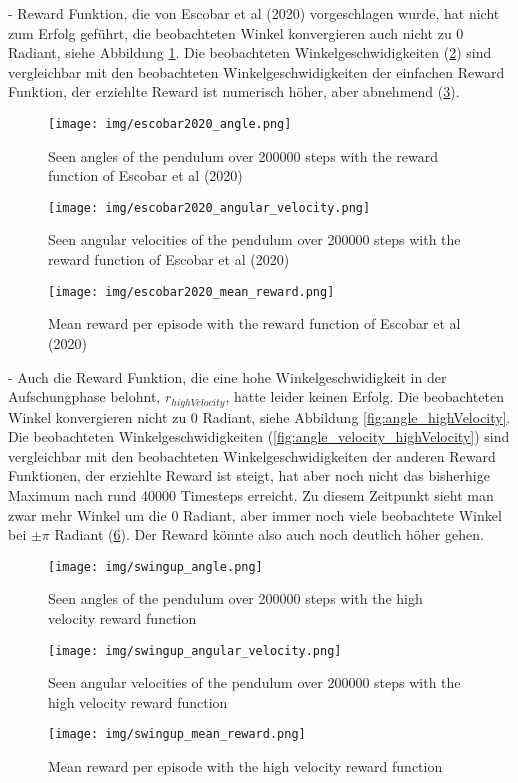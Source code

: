 - Reward Funktion, die von Escobar et al (2020) vorgeschlagen wurde, hat nicht zum Erfolg geführt, die beobachteten Winkel konvergieren auch nicht zu 0 Radiant, siehe Abbildung \ref{fig:angle_escobar2020}. Die beobachteten Winkelgeschwidigkeiten (\ref{fig:angle_velocity_escobar2020}) sind vergleichbar mit den beobachteten Winkelgeschwidigkeiten der einfachen Reward Funktion, der erziehlte Reward ist numerisch höher, aber abnehmend (\ref{fig:mean_reward_escobar2020}).
\begin{figure}[htbp]
    \centering
    \texttt{[image: img/escobar2020\_angle.png]}
    \caption{Seen angles of the pendulum over 200000 steps with the reward function of Escobar et al (2020)}
    \label{fig:angle_escobar2020}
\end{figure}
\begin{figure}[htbp]
    \centering
    \texttt{[image: img/escobar2020\_angular\_velocity.png]}
    \caption{Seen angular velocities of the pendulum over 200000 steps with the reward function of Escobar et al (2020)}
    \label{fig:angle_velocity_escobar2020}
\end{figure}
\begin{figure}[htbp]
    \centering
    \texttt{[image: img/escobar2020\_mean\_reward.png]}
    \caption{Mean reward per episode with the reward function of Escobar et al (2020)}
    \label{fig:mean_reward_escobar2020}
\end{figure}

- Auch die Reward Funktion, die eine hohe Winkelgeschwidigkeit in der Aufschungphase belohnt, $r_{highVelocity}$, hatte leider keinen Erfolg. Die beobachteten Winkel konvergieren nicht zu 0 Radiant, siehe Abbildung \ref{fig:angle_highVelocity}. Die beobachteten Winkelgeschwidigkeiten (\ref{fig:angle_velocity_highVelocity}) sind vergleichbar mit den beobachteten Winkelgeschwidigkeiten der anderen Reward Funktionen, der erziehlte Reward ist steigt, hat aber noch nicht das bisherhige Maximum nach rund 40000 Timesteps erreicht. Zu diesem Zeitpunkt sieht man zwar mehr Winkel um die 0 Radiant, aber immer noch viele beobachtete Winkel bei $\pm\pi$ Radiant (\ref{fig:mean_reward_swingup}). Der Reward könnte also auch noch deutlich höher gehen.
\begin{figure}[htbp]
    \centering
    \texttt{[image: img/swingup\_angle.png]}
    \caption{Seen angles of the pendulum over 200000 steps with the high velocity reward function}
    \label{fig:angle_swingup}
\end{figure}
\begin{figure}[htbp]
    \centering
    \texttt{[image: img/swingup\_angular\_velocity.png]}
    \caption{Seen angular velocities of the pendulum over 200000 steps with the high velocity reward function}
    \label{fig:angle_velocity_swingup}
\end{figure}
\begin{figure}[htbp]
    \centering
    \texttt{[image: img/swingup\_mean\_reward.png]}
    \caption{Mean reward per episode with the high velocity reward function}
    \label{fig:mean_reward_swingup}
\end{figure}

